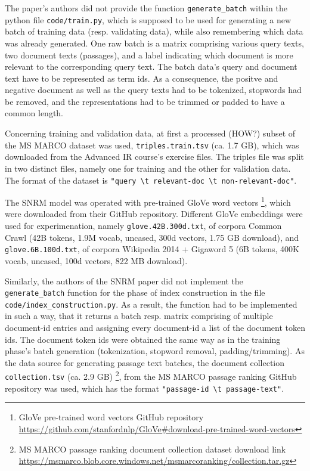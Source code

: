The paper's authors did not provide the function \verb|generate_batch| within the python file \verb|code/train.py|, 
    which is supposed to be used for generating a new batch of training data (resp. validating data), while 
    also remembering which data was already generated.
One raw batch is a matrix comprising various query texts, two document texts (passages), and a label indicating which document 
    is more relevant to the corresponding query text.
The batch data's query and document text have to be represented as term ids. 
As a consequence, the positve and negative document as well as the query texts had to be tokenized, stopwords had be removed,
    and the representations had to be trimmed or padded to have a common length.

Concerning training and validation data, at first a processed (HOW?) subset of the MS MARCO dataset was used, 
    \verb|triples.train.tsv| (ca. 1.7 GB), which was downloaded from the Advanced IR course's exercise files.
The triples file was split in two distinct files, namely one for training and the other for validation data.
The format of the dataset is \verb|"query \t relevant-doc \t non-relevant-doc"|.

The SNRM model was operated with pre-trained GloVe word vectors
    \footnote{GloVe pre-trained word vectors GitHub repository \url{https://github.com/stanfordnlp/GloVe\#download-pre-trained-word-vectors}},
    which were downloaded from their GitHub repository.
Different GloVe embeddings were used for experimenation, namely \verb|glove.42B.300d.txt|, 
    of corpora Common Crawl (42B tokens, 1.9M vocab, uncased, 300d vectors, 1.75 GB download), 
    and \verb|glove.6B.100d.txt|, of corpora Wikipedia 2014 + Gigaword 5 (6B tokens, 400K vocab, uncased, 100d vectors, 822 MB download).


Similarly, the authors of the SNRM paper did not implement the \verb|generate_batch| function for the phase of index construction in 
    the file \verb|code/index_construction.py|. As a result, the function had to be implemented in such a way, that it returns a
    batch resp. matrix comprising of multiple document-id entries and assigning every document-id a list of the document token ids.
    The document token ids were obtained the same way as in the training phase's batch generation 
    (tokenization, stopword removal, padding/trimming).
As the data source for generating passage text batches, the document collection \verb|collection.tsv| (ca. 2.9 GB)
    \footnote{MS MARCO passage ranking document collection dataset download link 
    \url{https://msmarco.blob.core.windows.net/msmarcoranking/collection.tar.gz}}, 
    from the MS MARCO passage ranking GitHub repository was used, which has the format \verb|"passage-id \t passage-text"|.

